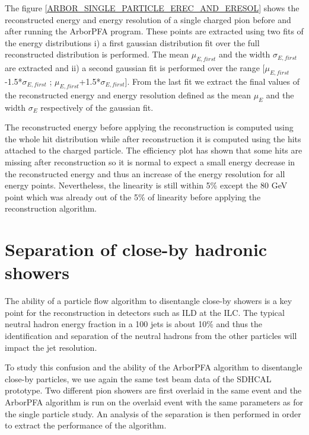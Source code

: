 \documentclass[cits]{JINST}
\begin{document}
The figure \ref{ARBOR_SINGLE_PARTICLE_EREC_AND_ERESOL} shows the reconstructed energy and energy resolution of a single charged pion before and after running the ArborPFA program. These points are extracted using two fits of the energy distributions i) a first gaussian distribution fit over the full reconstructed distribution is performed. The mean $\mu_{E,first}$ and the width $\sigma_{E,first}$ are extracted and ii) a second gaussian fit is performed over the range [$\mu_{E,first}$-1.5*$\sigma_{E,first}$ ; $\mu_{E,first}$+1.5*$\sigma_{E,first}$]. From the last fit we extract the final values of the reconstructed energy and energy resolution defined as the mean $\mu_E$ and the width $\sigma_E$ respectively of the gaussian fit.

The reconstructed energy before applying the reconstruction is computed using the whole hit distribution while after reconstruction it is computed using the hits attached to the charged particle. The efficiency plot has shown that some hits are missing after reconstruction so it is normal to expect a small energy decrease in the reconstructed energy and thus an increase of the energy resolution for all energy points. Nevertheless, the linearity is still within 5\% except the 80 GeV point which was already out of the 5\% of linearity before applying the reconstruction algorithm.

\section{Separation of close-by hadronic showers}

The ability of a particle flow algorithm to disentangle close-by showers is a key point for the reconstruction in detectors such as ILD at the ILC. The typical neutral hadron energy fraction in a 100 jets is about 10\% and thus the identification and separation of the neutral hadrons from the other particles will impact the jet resolution.

To study this confusion and the ability of the ArborPFA algorithm to disentangle close-by particles, we use again the same test beam data of the SDHCAL prototype. Two different pion showers are first overlaid in the same event and the ArborPFA algorithm is run on the overlaid event with the same parameters as for the single particle study. An analysis of the separation is then performed in order to extract the performance of the algorithm.
\end{document}
